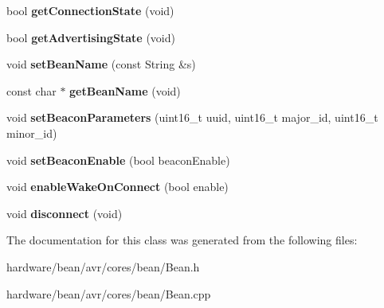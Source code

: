 \begin{DoxyCompactItemize}
\item 
\hypertarget{class_bean_class_ab426b11e8bee60de92707254c0501c20}{}bool {\bfseries get\+Connection\+State} (void)\label{class_bean_class_ab426b11e8bee60de92707254c0501c20}

\item 
\hypertarget{class_bean_class_a099bbffcf98e71f533f8277ec5274785}{}bool {\bfseries get\+Advertising\+State} (void)\label{class_bean_class_a099bbffcf98e71f533f8277ec5274785}

\item 
\hypertarget{class_bean_class_a32c0dc702c367caf274b72ba4a4cb8a2}{}void {\bfseries set\+Bean\+Name} (const String \&s)\label{class_bean_class_a32c0dc702c367caf274b72ba4a4cb8a2}

\item 
\hypertarget{class_bean_class_ab18bdd9e9afd1d2fbba1590b9121becd}{}const char $\ast$ {\bfseries get\+Bean\+Name} (void)\label{class_bean_class_ab18bdd9e9afd1d2fbba1590b9121becd}

\item 
\hypertarget{class_bean_class_a3b78a7b755cda9f066104f339638d69c}{}void {\bfseries set\+Beacon\+Parameters} (uint16\+\_\+t uuid, uint16\+\_\+t major\+\_\+id, uint16\+\_\+t minor\+\_\+id)\label{class_bean_class_a3b78a7b755cda9f066104f339638d69c}

\item 
\hypertarget{class_bean_class_a354e2ff36d0e101b35255bae0a5e33ca}{}void {\bfseries set\+Beacon\+Enable} (bool beacon\+Enable)\label{class_bean_class_a354e2ff36d0e101b35255bae0a5e33ca}

\item 
\hypertarget{class_bean_class_a639e425394c820a99025d136dddd3369}{}void {\bfseries enable\+Wake\+On\+Connect} (bool enable)\label{class_bean_class_a639e425394c820a99025d136dddd3369}

\item 
\hypertarget{class_bean_class_a1509dbbc3ddbd08725e2cb65a9289e90}{}void {\bfseries disconnect} (void)\label{class_bean_class_a1509dbbc3ddbd08725e2cb65a9289e90}

\end{DoxyCompactItemize}


The documentation for this class was generated from the following files\+:\begin{DoxyCompactItemize}
\item 
hardware/bean/avr/cores/bean/Bean.\+h\item 
hardware/bean/avr/cores/bean/Bean.\+cpp\end{DoxyCompactItemize}

